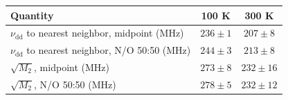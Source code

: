 \begin{tabular}{lcc}
\toprule
Quantity & 100 K & 300 K\\
\midrule
$\nu_\mathrm{dd}$ to nearest neighbor, midpoint (MHz) & $236\pm1$ & $207\pm8$\\
$\nu_\mathrm{dd}$ to nearest neighbor, N/O 50:50 (MHz) & $244\pm3$ & $213\pm8$\\
$\sqrt{M_2}$, midpoint (MHz) & $273\pm8$ & $232\pm16$\\
$\sqrt{M_2}$, N/O 50:50 (MHz) & $278\pm5$ & $232\pm12$\\
\bottomrule
\end{tabular}
